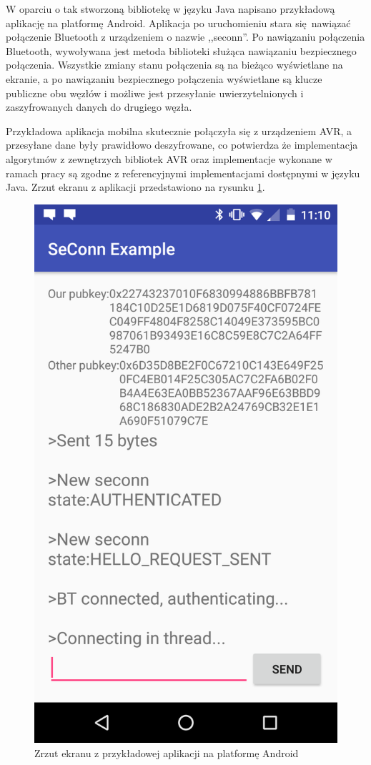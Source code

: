 W oparciu o tak stworzoną bibliotekę w języku Java napisano przykładową aplikację na platformę Android. Aplikacja po uruchomieniu stara się nawiązać połączenie Bluetooth z urządzeniem o nazwie ,,seconn''. Po nawiązaniu połączenia Bluetooth, wywoływana jest metoda biblioteki służąca nawiązaniu bezpiecznego połączenia. Wszystkie zmiany stanu połączenia są na bieżąco wyświetlane na ekranie, a po nawiązaniu bezpiecznego połączenia wyświetlane są klucze publiczne obu węzłów i możliwe jest przesyłanie uwierzytelnionych i zaszyfrowanych danych do drugiego węzła.

Przykładowa aplikacja mobilna skutecznie połączyła się z urządzeniem AVR, a przesyłane dane były prawidłowo deszyfrowane, co potwierdza że implementacja algorytmów z zewnętrzych bibliotek AVR oraz implementacje wykonane w ramach pracy są zgodne z referencyjnymi implementacjami dostępnymi w języku Java. Zrzut ekranu z aplikacji przedstawiono na rysunku \ref{fig:android}.

\begin{figure}
\centering
\includegraphics[height=0.6\textheight]{images/android.png}
\caption{Zrzut ekranu z przykładowej aplikacji na platformę Android}
\label{fig:android}
\end{figure}
